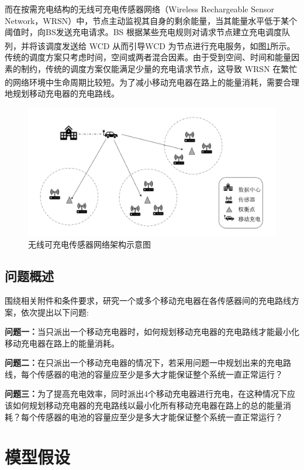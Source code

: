 \documentclass{whutmod}
\newcommand{\upcite}[1]{\textsuperscript{\cite{#1}}}
\begin{document}
	    	
	    	而在按需充电结构的无线可充电传感器网络（Wireless Rechargeable Sensor Network，WRSN）中，节点主动监视其自身的剩余能量，当其能量水平低于某个阈值时，向BS发送充电请求。BS 根据某些充电规则对请求节点建立充电调度队列，并将该调度发送给 WCD 从而引导WCD 为节点进行充电服务\upcite{3}，如图\ref{lasbel}所示。传统的调度方案只考虑时间，空间或两者混合因素。由于受到空间、时间和能量因素的制约，传统的调度方案仅能满足少量的充电请求节点，这导致 WRSN 在繁忙的网络环境中生命周期比较短\upcite{3}。为了减小移动充电器在路上的能量消耗，需要合理地规划移动充电器的充电路线。
				\begin{figure}[H]
		\centering
		\includegraphics[width=\textwidth]{figures/demo.png}
		\caption{无线可充电传感器网络架构示意图}\label{lasbel}
	\end{figure}
	
		\subsection{问题概述}
		    围绕相关附件和条件要求，研究一个或多个移动充电器在各传感器间的充电路线方案，依次提出以下问题:
				 
			
			\textbf{问题一：}当只派出一个移动充电器时，如何规划移动充电器的充电路线才能最小化移动充电器在路上的能量消耗。
			
			\textbf{问题二：}在只派出一个移动充电器的情况下，若采用问题一中规划出来的充电路线，每个传感器的电池的容量应至少是多大才能保证整个系统一直正常运行？
			
			\textbf{问题三：}为了提高充电效率，同时派出4个移动充电器进行充电，在这种情况下应该如何规划移动充电器的充电路线以最小化所有移动充电器在路上的总的能量消耗？每个传感器的电池的容量应至少是多大才能保证整个系统一直正常运行？

	
	\section{模型假设}
\end{document}
